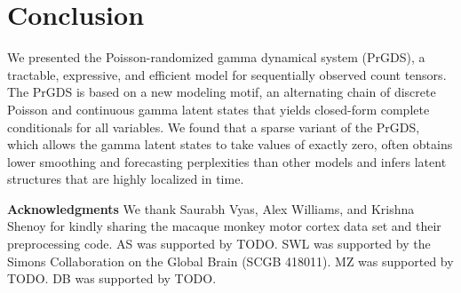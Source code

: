 \documentclass{article}
\begin{document}

\section{Conclusion} We presented the Poisson-randomized gamma dynamical system (PrGDS), a tractable, expressive, and efficient model for sequentially observed count tensors. The PrGDS is based on a new modeling motif, an alternating chain of discrete Poisson and continuous gamma latent states that yields closed-form complete conditionals for all variables. We found that a sparse variant of the PrGDS, which allows the gamma latent states to take values of exactly zero, often obtains lower smoothing and forecasting perplexities than other models and infers latent structures that are highly localized in time.


{\small
  \textbf{Acknowledgments} \;
  We thank Saurabh Vyas, Alex Williams, and Krishna Shenoy for kindly sharing the macaque monkey motor cortex data set and their preprocessing code.  AS was supported by TODO. SWL was supported by the Simons Collaboration on the Global Brain (SCGB 418011).  MZ was supported by TODO.  DB was supported by TODO.}

\end{document}

